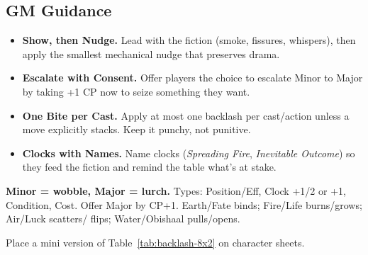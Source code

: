\subsection*{GM Guidance}\label{subsec:backlash-gm}
\begin{itemize}
\item \textbf{Show, then Nudge.} Lead with the fiction (smoke, fissures, whispers), then apply the smallest mechanical nudge that preserves drama.
\item \textbf{Escalate with Consent.} Offer players the choice to escalate Minor to Major by taking +1 CP now to seize something they want.
\item \textbf{One Bite per Cast.} Apply at most one backlash per cast/action unless a move explicitly stacks. Keep it punchy, not punitive.
\item \textbf{Clocks with Names.} Name clocks (\emph{Spreading Fire}, \emph{Inevitable Outcome}) so they feed the fiction and remind the table what’s at stake.
\end{itemize}

\begin{tcolorbox}[title={Backlash Cheatsheet (margin-ready)},colback=gray!5,colframe=black]
\small \textbf{Minor = wobble, Major = lurch.} Types: Position/Eff, Clock +1/2 or +1, Condition, Cost. Offer Major by CP+1. Earth/Fate binds; Fire/Life burns/grows; Air/Luck scatters/ flips; Water/Obishaal pulls/opens.\par\smallskip
Place a mini version of Table~\ref{tab:backlash-8x2} on character sheets.
\end{tcolorbox}
